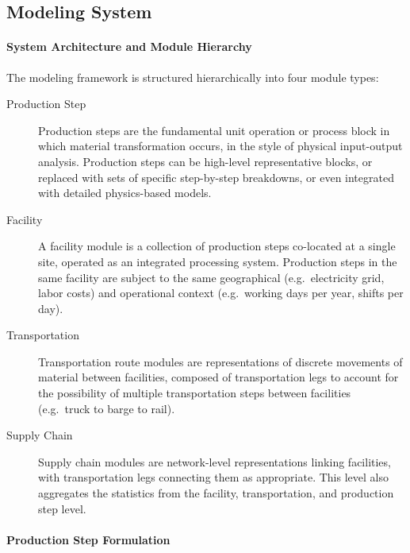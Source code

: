 \documentclass{article}
\renewcommand\_{\textunderscore\allowbreak}
\begin{document}
\clearpage
\subsection{Modeling System}\label{app:04-methods-system}

\paragraph{System Architecture and Module Hierarchy}\label{app:04-methods-system-hierarchy}\leavevmode\par

The modeling framework is structured hierarchically into four module types:

\begin{description}
    \item[Production Step] Production steps are the fundamental unit operation or process block in which material transformation occurs, in the style of physical input-output analysis. Production steps can be high-level representative blocks, or replaced with sets of specific step-by-step breakdowns, or even integrated with detailed physics-based models.

    \item[Facility] A facility module is a collection of production steps co-located at a single site, operated as an integrated processing system. Production steps in the same facility are subject to the same geographical (e.g.\ electricity grid, labor costs) and operational context (e.g.\ working days per year, shifts per day).

    \item[Transportation] Transportation route modules are representations of discrete movements of material between facilities, composed of transportation legs to account for the possibility of multiple transportation steps between facilities (e.g.\ truck to barge to rail).

    \item[Supply Chain] Supply chain modules are network-level representations linking facilities, with transportation legs connecting them as appropriate. This level also aggregates the statistics from the facility, transportation, and production step level.
\end{description}

\paragraph{Production Step Formulation}\label{app:04-methods-system-prodstep}\leavevmode\par
\end{document}
